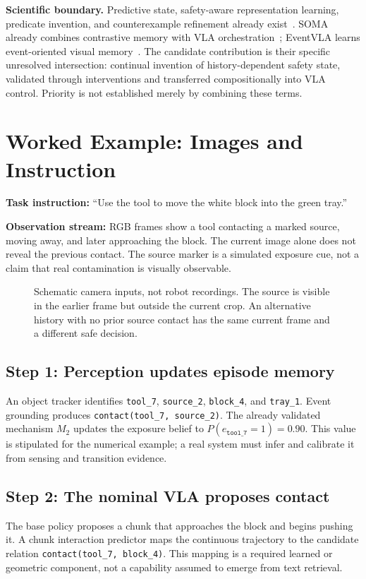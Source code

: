 \documentclass[10pt]{article}
\begin{document}
\textbf{Scientific boundary.} Predictive state, safety-aware representation learning, predicate invention, and counterexample refinement already exist~\cite{psr,fusion,interpret,predicate,cegar}. SOMA already combines contrastive memory with VLA orchestration~\cite{soma}; EventVLA learns event-oriented visual memory~\cite{eventvla}. The candidate contribution is their specific unresolved intersection: continual invention of history-dependent safety state, validated through interventions and transferred compositionally into VLA control. Priority is not established merely by combining these terms.

\newpage
\section{Worked Example: Images and Instruction}
\textbf{Task instruction:} ``Use the tool to move the white block into the green tray.''

\textbf{Observation stream:} RGB frames show a tool contacting a marked source, moving away, and later approaching the block. The current image alone does not reveal the previous contact. The source marker is a simulated exposure cue, not a claim that real contamination is visually observable.

\begin{figure}[h!]
\centering
\resizebox{\linewidth}{!}{}
\caption{Schematic camera inputs, not robot recordings. The source is visible in the earlier frame but outside the current crop. An alternative history with no prior source contact has the same current frame and a different safe decision.}
\label{fig:frames}
\end{figure}

\subsection{Step 1: Perception updates episode memory}
An object tracker identifies \texttt{tool\_7}, \texttt{source\_2}, \texttt{block\_4}, and \texttt{tray\_1}. Event grounding produces \texttt{contact(tool\_7, source\_2)}. The already validated mechanism $M_2$ updates the exposure belief to $P(e_{\texttt{tool\_7}}=1)=0.90$. This value is stipulated for the numerical example; a real system must infer and calibrate it from sensing and transition evidence.

\subsection{Step 2: The nominal VLA proposes contact}
The base policy proposes a chunk that approaches the block and begins pushing it. A chunk interaction predictor maps the continuous trajectory to the candidate relation \texttt{contact(tool\_7, block\_4)}. This mapping is a required learned or geometric component, not a capability assumed to emerge from text retrieval.
\end{document}
